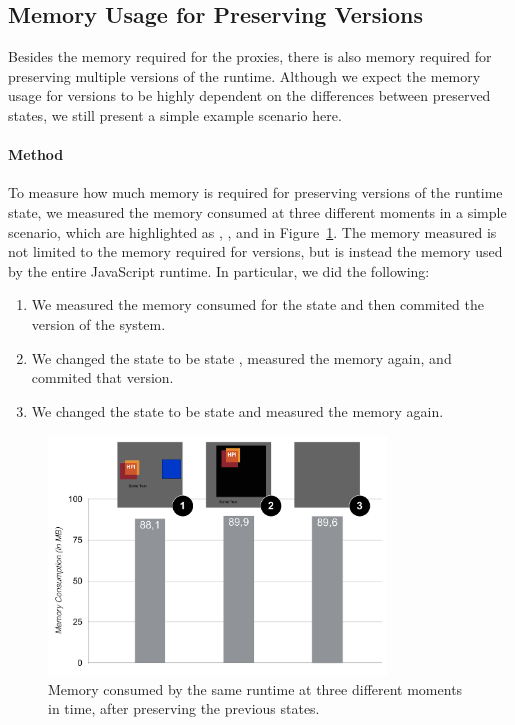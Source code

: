 \subsection{Memory Usage for Preserving Versions}

Besides the memory required for the proxies, there is also memory required for preserving multiple versions of the runtime.
Although we expect the memory usage for versions to be highly dependent on the differences between preserved states, we still present a simple example scenario here.

\paragraph{Method}
To measure how much memory is required for preserving versions of the runtime state, we measured the memory consumed at three different moments in a simple scenario, which are highlighted as , , and  in Figure~\ref{fig:MemoryOverheadForVersions}.
The memory measured is not limited to the memory required for versions, but is instead the memory used by the entire JavaScript runtime.
In particular, we did the following:
\begin{enumerate}
    \item We measured the memory consumed for the state  and then commited the version of the system.
    \item We changed the state to be state , measured the memory again, and commited that version.
    \item We changed the state to be state  and measured the memory again.
\end{enumerate}

\begin{figure}[h!]
    \centering
    \includegraphics[width=0.8\textwidth]{figures/6_evaluation/2_memoryForVersions.pdf}
    \caption{Memory consumed by the same runtime at three different moments in time, after preserving the previous states.}
    \label{fig:MemoryOverheadForVersions}
\end{figure}

